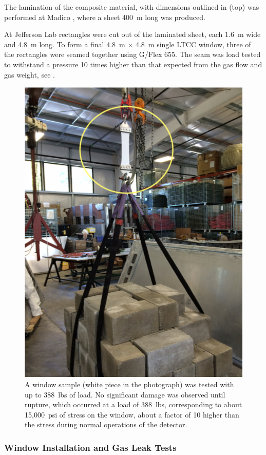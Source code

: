 The lamination of the composite material, with dimensions outlined in  (top) was performed
at Madico \cite{madico}, where a sheet 400~m long was produced.

At Jefferson Lab rectangles were cut out of the laminated sheet, each 1.6~m wide and 4.8~m long.
To form a final 4.8~m $\times$ 4.8~m single LTCC window, three of the rectangles were seamed together
using G/Flex 655. The seam was load tested to withstand a pressure 10 times higher than that expected from
the gas flow and gas weight, see .

\begin{figure}
	\centering
	\includegraphics[width=1.0\columnwidth, height=1.0\columnwidth]{img/windowTest.png}
	\caption{A window sample (white piece in the photograph) was tested with up to 388~lbs of load.
          No significant damage was observed until rupture, which occurred at a load of 388~lbs, corresponding
          to about 15,000~psi of stress on the window, about a factor of 10 higher than the stress during normal
          operations of the detector.}
	\label{fig:windowTest}
\end{figure}

\subsubsection{Window Installation and Gas Leak Tests}

